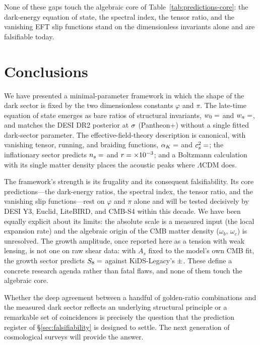 \documentclass[aps,prd,preprint,amsmath,amssymb,nofootinbib,longbibliography]{revtex4-2}
\begin{document}
None of these gaps touch the algebraic core of
Table~\ref{tab:predictions-core}: the dark-energy equation of state, the
spectral index, the tensor ratio, and the vanishing EFT slip functions stand on
the dimensionless invariants alone and are falsifiable today.

\section{Conclusions}
\label{sec:conclusions}

We have presented a minimal-parameter framework in which the shape of the dark
sector is fixed by the two dimensionless constants $\varphi$ and $\pi$. The
late-time equation of state emerges as bare ratios of structural invariants,
$w_0=\val{W0_d6}$ and $w_a=\val{WA_d6}$, and matches the DESI DR2 posterior at
$\val{p2_w0wa_ssee_ec26}\sigma$ (Pantheon+) without a single fitted dark-sector parameter. The
effective-field-theory description is canonical, with vanishing tensor, running,
and braiding functions, $\alpha_K=\val{alpha_K_z0_d6}$ and $c_s^2=\val{cs2_condensado_d6}$; the inflationary sector
predicts $n_s=\val{N_S_d6}$ and $r=\val{r_tensor_mil_d1}\times10^{-3}$; and a Boltzmann calculation with its single matter density
places the acoustic peaks where $\Lambda$CDM does.

The framework's strength is its frugality and its consequent falsifiability.
Its core predictions---the dark-energy ratios, the spectral index, the tensor
ratio, and the vanishing slip functions---rest on $\varphi$ and $\pi$ alone and
will be tested decisively by DESI Y3, Euclid, LiteBIRD, and CMB-S4 within this
decade. We have been equally explicit about its limits: the absolute scale is a
measured input (the local expansion rate) and the algebraic origin of the CMB matter density ($\omega_b$, $\omega_c$) is unresolved. The growth amplitude, once reported here as a tension with weak lensing, is not one on raw shear data: with $A_s$ fixed to the model's own CMB fit, the growth sector predicts $S_8=\val{S8_leg_pred}$ against KiDS-Legacy's $\val{S8_legacy_dato}\pm\val{S8_legacy_dato_sigma}$. These
define a concrete research agenda rather than fatal flaws, and none of them
touch the algebraic core.

Whether the deep agreement between a handful of golden-ratio combinations and
the measured dark sector reflects an underlying structural principle or a
remarkable set of coincidences is precisely the question that the prediction
register of \S\ref{sec:falsifiability} is designed to settle. The next
generation of cosmological surveys will provide the answer.
\end{document}
